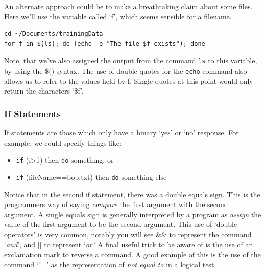 \documentclass[a4paper,12pt,twoside]{memoir}
\begin{document}
\begin{advanced}
An alternate approach could be to make a breathtaking claim about some files.
Here we'll use the variable called `f', which seems sensible for a filename.
\begin{lstlisting}
cd ~/Documents/trainingData
for f in $(ls); do (echo -e "The file $f exists"); done
\end{lstlisting}
\end{advanced}

Note, that we've also assigned the output from the command \texttt{ls} to this variable, by using the \$() syntax.
The use of double quotes for the \texttt{echo} command also allows us to refer to the values held by f.
Single quotes at this point would only return the characters `\$f'.

\subsubsection{If Statements}
If statements are those which only have a binary `yes' or `no' response.
For example, we could specify things like:
\begin{itemize}
\item \texttt{if} (i>1) then \texttt{do} something, or
\item \texttt{if} (fileName==bob.txt) then \texttt{do} something else
\end{itemize}

\begin{information}
Notice that in the second if statement, there was a double equals sign.
This is the programmers way of saying \textit{compare} the first argument with the second argument.
A single equals sign is generally interpreted by a program as \textit{assign} the value of the first argument to be the second argument.
This use of `double operators' is very common, notably you will see \&\& to represent the command `\textit{and}', and || to represent `\textit{or}.'
A final useful trick to be aware of is the use of an exclamation mark to reverse a command.
A good example of this is the use of the command `!=' as the representation of \textit{not equal to} in a logical test.
\end{information}
\end{document}
